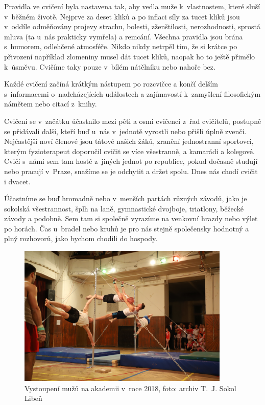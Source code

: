 \documentclass[a5paper, 11pt, twoside]{article}
\begin{document}
Pravidla ve cvičení byla nastavena tak, aby vedla muže k~vlastnostem,
které sluší v~běžném životě. Nejprve za deset kliků a po inflaci síly za
tucet kliků jsou v~oddíle odměňovány projevy strachu, bolesti,
zženštilosti, nerozhodnosti, sprostá mluva (ta u~nás prakticky vymřela)
a remcání. Všechna pravidla jsou brána s~humorem, odlehčené atmosféře.
Nikdo nikdy netrpěl tím, že si krátce po přivození například zlomeniny
musel dát tucet kliků, naopak ho to ještě přimělo k~úsměvu. Cvičíme taky
pouze v~bílém nátělníku nebo nahoře bez.

Každé cvičení začíná krátkým nástupem po rozcvičce a končí delším
s~informacemi o~nadcházejících událostech a zajímavostí k~zamyšlení
filosofickým námětem nebo citací z~knihy.

Cvičení se v~začátku účastnilo mezi pěti a osmi cvičenci z~řad
cvičitelů, postupně se přidávali další, kteří buď u~nás v~jednotě
vyrostli nebo přišli úplně zvenčí. Nejčastější noví členové jsou tátové
našich žáků, zranění jednostranní sportovci, kterým fyzioterapeut
doporučil cvičit se více všestranně, a kamarádi a kolegové. Cvičí s~námi
sem tam hosté z~jiných jednot po republice, pokud dočasně studují nebo
pracují v~Praze, snažíme se je odchytit a držet spolu. Dnes nás chodí
cvičit i dvacet.

Účastníme se buď hromadně nebo v~menších partách různých závodů, jako je
sokolská všestrannost, šplh na laně, gymnastické dvojboje, triatlony,
běžecké závody a podobně. Sem tam si společně vyrazíme na venkovní
hrazdy nebo výlet po horách. Čas u~bradel nebo kruhů je pro nás stejně
společensky hodnotný a plný rozhovorů, jako bychom chodili do hospody.

\begin{figure}[t]
  \centering 
  \includegraphics[width=0.9\textwidth]{img/75_akademie_muzi.JPG}
  \caption*{Vystoupení mužů na akademii v~roce 2018, foto: archiv T.~J. Sokol
  Libeň}
\end{figure}
\end{document}
